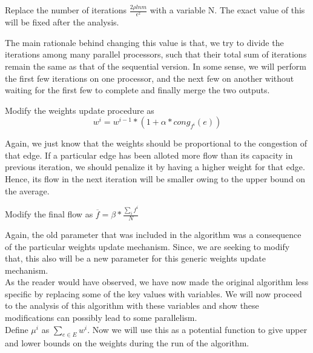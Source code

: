\documentclass[BTech]{iitmdiss}
\begin{document}
	  \begin{modif}
	    Replace the number of iterations $\frac{2 \rho ln m}{\epsilon^2}$ with a variable N. The exact value of this will be fixed after the analysis.
	  \end{modif}
	  
	  The main rationale behind changing this value is that, we try to divide the iterations among many parallel processors, such that their total
	  sum of iterations remain the same as that of the sequential version. In some sense, we will perform the first few iterations on one processor,
	  and the next few on another without waiting for the first few to complete and finally merge the two outputs. 
	  
	  \begin{modif}
	   Modify the weights update procedure as 
	   $$w^{i} = w^{i-1} \ast \left( 1+\alpha \ast cong_{f^i}(e)\right)$$
	  \end{modif}
	  
	  Again, we just know that the weights should be proportional to the congestion of that edge. If a particular edge has been alloted more flow
	  than its capacity in previous iteration, we should penalize it by having a higher weight for that edge. Hence, its flow in the next iteration
	  will be smaller owing to the upper bound on the average.
	  
          \begin{modif}
	    Modify the final flow as $\overline{f} = \beta \ast \frac{\displaystyle\sum_{i}f^i}{N}$
          \end{modif}
  
	   Again, the old parameter that was included in the algorithm was a consequence of the particular weights update mechanism. Since, we are seeking
	   to modify that, this also will be a new parameter for this generic weights update mechanism. \\
	   
	   As the reader would have observed, we have now made the original algorithm less specific by replacing some of the 
	   key values with variables. We will now proceed to the analysis of this algorithm with these variables and show these modifications 
	   can possibly lead to some parallelism. \\
	   
	   Define $\mu^i$ as $\displaystyle\sum_{e \in E} w^i$. Now we will use this as a potential function to give upper and lower bounds on the 
	   weights during the run of the algorithm. \\
	   
\end{document}
